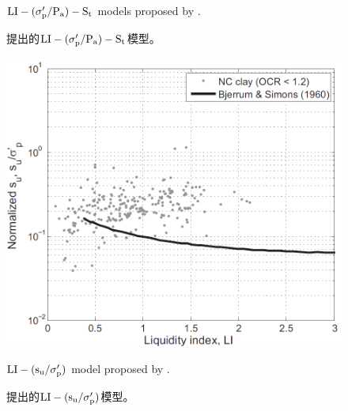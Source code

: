 \begin{figure}[!p]
\begin{minipage}[t]{0.48\textwidth}
        \caption{$\rm{LI}-(\sigma_p'/P_a)-S_t$ models proposed by \citet{Ching2012522}.}
        \vspace{-5pt}
        \addtocounter{figure}{-1}
        \renewcommand{\figurename}{图}
        \caption{\citet{Ching2012522}提出的$\rm{LI}-(\sigma_p'/P_a)-S_t$模型。}
        \renewcommand{\figurename}{Figure}
    \end{minipage}
\end{figure}

\begin{figure}[!p]
    \centering
    \begin{minipage}[t]{0.48\textwidth}
        \centering
        \includegraphics[width=\textwidth]{figures/figure-8.png}
        \caption{$\rm{LI}-(s_u/\sigma_p')$ model proposed by \citet{Bjerrum1960711}.}
        \vspace{-5pt}
        \addtocounter{figure}{-1}
        \renewcommand{\figurename}{图}
        \caption{\citet{Bjerrum1960711}提出的$\rm{LI}-(s_u/\sigma_p')$模型。}
        \renewcommand{\figurename}{Figure}
    \end{minipage}
    \begin{minipage}[t]{0.48\textwidth}
        \centering

\end{minipage}
\end{figure}
